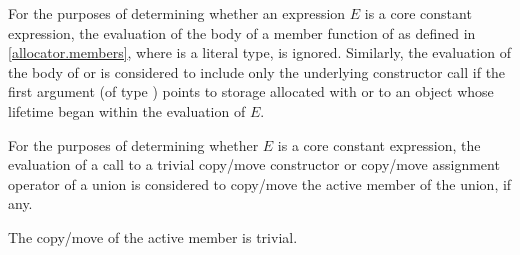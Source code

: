 \pnum
For the purposes of determining
whether an expression $E$ is a core constant expression,
the evaluation of the body of a member function of 
as defined in \ref{allocator.members}, where  is a literal type,
is ignored.
Similarly, the evaluation of the body of
 or
is considered to include only
the underlying constructor call
if the first argument (of type ) points
to storage allocated with  or
to an object whose lifetime began within the evaluation of $E$.

\pnum
For the purposes of determining whether $E$ is a core constant expression,
the evaluation of a call to
a trivial copy/move constructor or copy/move assignment operator of a union
is considered to copy/move the active member of the union, if any.
\begin{note}
The copy/move of the active member is trivial.
\end{note}

